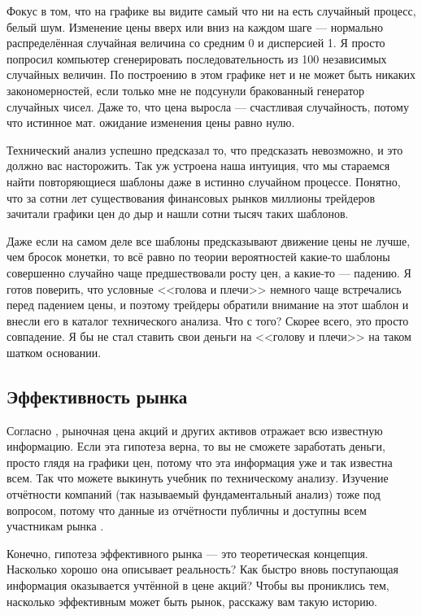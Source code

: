Фокус в том, что на графике вы видите самый что ни на есть случайный процесс, 
белый шум. Изменение цены вверх или вниз на каждом шаге --- нормально 
распределённая случайная величина со средним 0 и дисперсией 1. Я просто попросил 
компьютер сгенерировать последовательность из 100 независимых случайных величин. 
По построению в этом графике нет и не может быть никаких закономерностей, если 
только мне не подсунули бракованный генератор случайных чисел. Даже то, что цена 
выросла --- счастливая случайность, потому что истинное мат. ожидание
изменения цены равно нулю.

Технический анализ успешно предсказал то, что предсказать невозможно, и это 
должно вас насторожить. Так уж устроена наша интуиция, что мы стараемся найти 
повторяющиеся шаблоны даже в истинно случайном процессе. Понятно, что за 
сотни лет существования финансовых рынков миллионы трейдеров зачитали графики 
цен до дыр и нашли сотни тысяч таких шаблонов.

Даже если на самом деле все шаблоны предсказывают движение цены не лучше, чем 
бросок монетки, то всё равно по теории вероятностей какие-то шаблоны совершенно 
случайно чаще предшествовали росту цен, а какие-то --- падению. Я готов 
поверить, что условные <<голова и плечи>> немного чаще встречались перед 
падением цены, и поэтому трейдеры обратили внимание на этот шаблон и внесли его 
в каталог технического анализа. Что с того? Скорее всего, это просто совпадение. 
Я бы не стал ставить свои деньги на <<голову и плечи>> на таком шатком 
основании.

\subsection{Эффективность рынка}

Согласно , 
рыночная цена акций и других активов отражает всю известную информацию. Если 
эта гипотеза верна, то вы не сможете заработать деньги, просто глядя на графики 
цен, потому что эта информация уже и так известна всем. Так что можете выкинуть 
учебник по техническому анализу. Изучение отчётности компаний (так называемый 
фундаментальный анализ) тоже под вопросом, потому что данные из отчётности 
публичны и доступны всем участникам рынка \cite[ch.~11]
{bodie2014investments}.

Конечно, гипотеза эффективного рынка --- это теоретическая концепция. Насколько
хорошо она описывает реальность? Как быстро вновь поступающая информация
оказывается учтённой в цене акций? Чтобы вы прониклись тем, насколько 
эффективным может быть рынок, расскажу вам такую историю.

